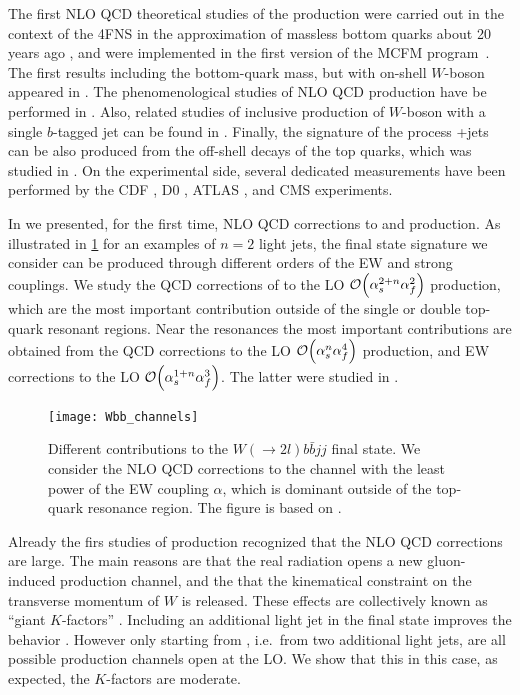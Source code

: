 The first NLO QCD theoretical studies of the \Wbb{} production were carried out in 
the context of the 4FNS in the approximation of massless bottom quarks about 20 years ago \cite{Bern:1997sc,Ellis:1998fv},
and were implemented in the first version of the MCFM program~\cite{mcfm7}.
The first results including the bottom-quark mass, but with on-shell $W$-boson 
appeared in \cite{FebresCordero:2006sj,Cordero:2009kv,Badger:2010mg,Oleari:2011ey}.
The phenomenological studies of NLO QCD \Wbbnj[1]{} production have be performed in \cite{Luisoni:2015mpa}.
Also, related studies of inclusive production of $W$-boson with a single $b$-tagged jet
can be found in \cite{Campbell:2006cu,Campbell:2008hh,Caola:2011pz}.
Finally, the signature of the process \Wbb{}+jets can be also produced from
the off-shell decays of the top quarks, which was studied in \cite{Denner:2017kzu}.
On the experimental side, several dedicated measurements
have been performed by the CDF \cite{Aaltonen:2009qi}, D0 \cite{D0:2012qt}, ATLAS \cite{Aad:2013vka}, and CMS \cite{Chatrchyan:2013uza,CMS:2016bb}
experiments.

In \cite{Anger:2017glm} we presented, for the first time, NLO QCD corrections to \Wbbnj[2]{} and
\Wbbnj[3]{} production. As illustrated in \cref{fig:wbb_channels} for an examples of $n=2$ light jets,
the final state signature we consider can be produced through different orders of the EW and strong couplings.
We study the QCD corrections of to the LO $\order{\alps^{2+n}\alpf^2}$ production,
which are the most important contribution outside of the single or double top-quark resonant regions.
Near the resonances the most important contributions are obtained from the QCD corrections to the LO $\order{\alps^{n}\alpf^4}$ production,
and EW corrections to the LO $\order{\alps^{1+n}\alpf^3}$. The latter were studied in \cite{Denner:2017kzu}.

\begin{figure}[t]
  \centering
  \texttt{[image: Wbb\_channels]}
  \caption{
    Different contributions to the $W(\to 2l)b\bar{b}jj$ final state.
    We consider the NLO QCD corrections to the channel with the least power of the EW coupling $\alpha$, which
    is dominant outside of the top-quark resonance region.
    The figure is based on \cite{Denner:2017kzu}.
  }
  \label{fig:wbb_channels}
\end{figure}


Already the firs studies of \Wbb{} production
recognized \cite{Ellis:1998fv,FebresCordero:2006sj,Cordero:2009kv} that the NLO QCD corrections are large. 
The main reasons are that the real radiation opens a new
gluon-induced production channel, and the that
the kinematical constraint on the transverse momentum of  $W$ is released.
These effects are collectively known as ``giant $K$-factors'' \cite{Rubin:2010xp}. 
Including an additional light jet in the final state improves the  behavior \cite{Luisoni:2015mpa}.
However only starting from \Wbbnj[2]{}, i.e.\ from two additional light jets, are all possible production
channels open at the LO.  We show that this in this case, as expected, the $K$-factors are moderate.


